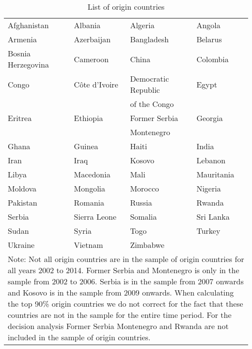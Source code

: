 \begin{table}[!ht]\centering \footnotesize
	\caption{List of origin countries}
	\begin{tabularx}{\textwidth}{XXXX}
		\hline \hline
		Afghanistan & Albania & 	Algeria & 	Angola \\
		[0.4em]
		Armenia & 	Azerbaijan & 	Bangladesh & Belarus \\
		[0.4em]
		Bosnia Herzegovina & 	Cameroon & 	China & Colombia \\
		[0.4em]
		Congo & 	Côte d'Ivoire & Democratic Republic  & 	Egypt \\
		& 	 & of the Congo &  \\
		[0.4em]
		Eritrea & 	Ethiopia & 	Former Serbia & 	Georgia  \\
		 &  & 	 Montenegro &  \\
		[0.4em]
		Ghana & Guinea & 	Haiti & India \\
		[0.4em]
		Iran &  Iraq &  Kosovo & Lebanon \\
		[0.4em]
		Libya & Macedonia & Mali & 	Mauritania \\
		[0.4em]
		Moldova & 	Mongolia & 	Morocco & 	Nigeria \\
		[0.4em]
		Pakistan & 	Romania & 	Russia & 	Rwanda \\
		[0.4em]
		Serbia & Sierra Leone & Somalia & Sri Lanka \\
		[0.4em]
		Sudan & Syria & Togo & Turkey \\
		[0.4em]
		Ukraine & 	Vietnam & 	Zimbabwe & \\
		\hline \hline
		\multicolumn{4}{p{\linewidth}}{Note: Not all origin countries are in the sample of origin countries for all years 2002 to 2014. Former Serbia and Montenegro is only in the sample from 2002 to 2006. Serbia is in the sample from 2007 onwards and Kosovo is in the sample from 2009 onwards. When calculating the top 90\% origin countries we do not correct for the fact that these countries are not in the sample for the entire time period. For the decision analysis Former Serbia Montenegro and Rwanda are not included in the sample of origin countries.}
	\end{tabularx}
\label{all_origin}
\end{table}
